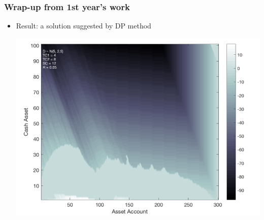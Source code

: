 \documentclass{beamer}
\begin{document}
\begin{frame}
\frametitle{Wrap-up from 1st year's work}
\begin{itemize}
\item Result: a solution suggested by DP method

\includegraphics[scale = 0.25]{ResultFirstYear_rdy.png}


\end{itemize}
\end{frame}
\end{document}
